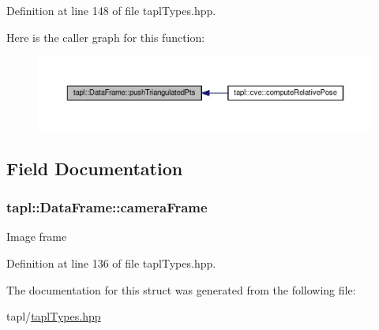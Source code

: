 Definition at line 148 of file tapl\+Types.\+hpp.



Here is the caller graph for this function\+:\nopagebreak
\begin{figure}[H]
\begin{center}
\leavevmode
\includegraphics[width=350pt]{structtapl_1_1DataFrame_a6a48c0c169570f49e3a3f87e2f947445_icgraph}
\end{center}
\end{figure}




\subsection{Field Documentation}
\subsubsection[{\texorpdfstring{camera\+Frame}{cameraFrame}}]{ tapl\+::\+Data\+Frame\+::camera\+Frame}\hypertarget{structtapl_1_1DataFrame_a6a9523806fd3280ddd54085669572288}{}\label{structtapl_1_1DataFrame_a6a9523806fd3280ddd54085669572288}
Image frame 

Definition at line 136 of file tapl\+Types.\+hpp.



The documentation for this struct was generated from the following file\+:\begin{DoxyCompactItemize}
\item 
tapl/\hyperlink{taplTypes_8hpp}{tapl\+Types.\+hpp}\end{DoxyCompactItemize}
